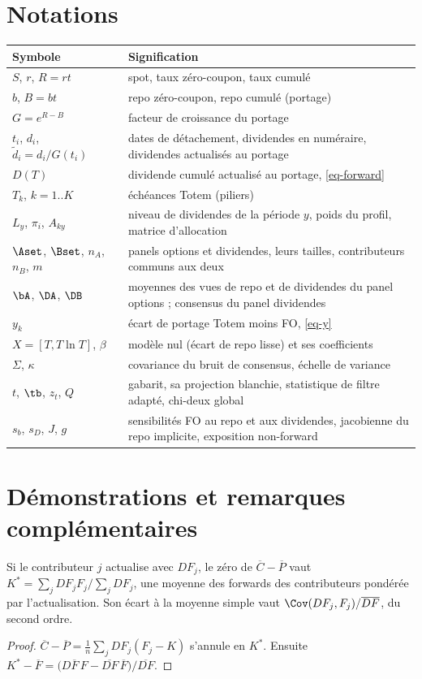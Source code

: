 \section{Notations}\label{app-notation}
\begin{center}\small
\begin{tabular}{lp{12cm}}
\toprule
Symbole & Signification\\
\midrule
$S$, $r$, $R=rt$ & spot, taux zéro-coupon, taux cumulé\\
$b$, $B=bt$ & repo zéro-coupon, repo cumulé (portage)\\
$G=e^{R-B}$ & facteur de croissance du portage\\
$t_i$, $d_i$, $\tilde d_i=d_i/G(t_i)$ & dates de détachement, dividendes en numéraire, dividendes actualisés au portage\\
$D(T)$ & dividende cumulé actualisé au portage, \cref{eq-forward}\\
$T_k$, $k=1..K$ & échéances Totem (piliers)\\
$L_y$, $\pi_i$, $A_{ky}$ & niveau de dividendes de la période $y$, poids du profil, matrice d'allocation\\
$\Aset$, $\Bset$, $n_A$, $n_B$, $m$ & panels options et dividendes, leurs tailles, contributeurs communs aux deux\\
$\bA$, $\DA$, $\DB$ & moyennes des vues de repo et de dividendes du panel options ; consensus du panel dividendes\\
$y_k$ & écart de portage Totem moins FO, \cref{eq-y}\\
$X=[T,T\ln T]$, $\beta$ & modèle nul (écart de repo lisse) et ses coefficients\\
$\Sigma$, $\kappa$ & covariance du bruit de consensus, échelle de variance\\
$t$, $\tb$, $z_t$, $Q$ & gabarit, sa projection blanchie, statistique de filtre adapté, chi-deux global\\
$s_b$, $s_D$, $J$, $g$ & sensibilités FO au repo et aux dividendes, jacobienne du repo implicite, exposition non-forward\\
\bottomrule
\end{tabular}
\end{center}

\section{Démonstrations et remarques complémentaires}\label{app-proofs}

\begin{lemma}
Si le contributeur $j$ actualise avec $DF_j$, le zéro de $\overline{C}-\overline{P}$ vaut $K^\ast=\sum_jDF_jF_j/\sum_jDF_j$,
une moyenne des forwards des contributeurs pondérée par l'actualisation. Son écart à la moyenne simple vaut
$\Cov(DF_j,F_j)/\overline{DF}$, du second ordre.
\end{lemma}
\begin{proof}
$\overline{C}-\overline{P}=\frac1n\sum_jDF_j(F_j-K)$ s'annule en $K^\ast$. Ensuite
$K^\ast-\overline F=\bigl(\overline{DF\,F}-\overline{DF}\,\overline F\bigr)/\overline{DF}$.
\end{proof}

